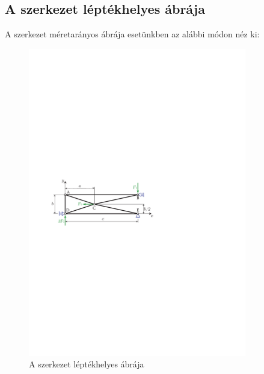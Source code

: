 \documentclass[12pt,a4paper]{article}
\begin{document}
\subsection{A szerkezet léptékhelyes ábrája}
A szerkezet méretarányos ábrája esetünkben az alábbi módon néz ki:
\begin{figure}[H]
    \centering
    \includegraphics[width=0.85\textwidth]{vszhf1_abra.pdf}
    \caption{A szerkezet léptékhelyes ábrája}
\end{figure}
\end{document}
